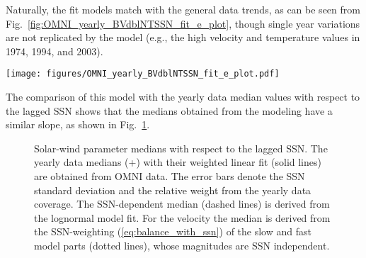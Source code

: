 \documentclass[]{aa}
\begin{document}
        Naturally, the fit models match with the general data trends, as can be seen from Fig.~\ref{fig:OMNI_yearly_BVdblNTSSN_fit_e_plot}, though single year variations are not replicated by the model (e.g., the high velocity and temperature values in 1974, 1994, and 2003).
        \begin{figure*}
                \texttt{[image: figures/OMNI\_yearly\_BVdblNTSSN\_fit\_e\_plot.pdf]}
                \caption{Solar wind parameter yearly data frequencies and lognormal fit models, both with their median values (white lines) over the OMNI time period 1963--2016. The corresponding yearly SSN and the shifted SSN for the models are indicated by gray and black lines. The velocity median is derived from the SSN-weighted constant lognormal parts (dotted lines).}
                \label{fig:OMNI_yearly_BVdblNTSSN_fit_e_plot}
        \end{figure*}
        The comparison of this model with the yearly data median values with respect to the lagged SSN shows that the medians obtained from the modeling have a similar slope, as shown in Fig.~\ref{fig:OMNI_yearly_BVNTvsSSN_a}.
        \begin{figure}
                \caption{Solar-wind parameter medians with respect to the lagged SSN. The yearly data medians (+) with their weighted linear fit (solid lines) are obtained from OMNI data. The error bars denote the SSN standard deviation and the relative weight from the yearly data coverage. The SSN-dependent median (dashed lines) is derived from the lognormal model fit. For the velocity the median is derived from the SSN-weighting (\ref{eq:balance_with_ssn}) of the slow and fast model parts (dotted lines), whose magnitudes are SSN independent.}
                \label{fig:OMNI_yearly_BVNTvsSSN_a}
        \end{figure}
\end{document}
